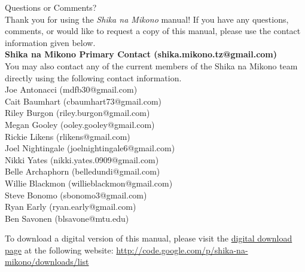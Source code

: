 \begin{center}
{\Huge Questions or Comments?}\\[12pt]
Thank you for using the \textit{Shika na Mikono} manual! If you have any questions, comments, or would like to request a copy of this manual, please use the contact information given below.\\[20pt]
\textbf{Shika na Mikono Primary Contact (shika.mikono.tz@gmail.com)}\\[20pt]
You may also contact any of the current members of the Shika na Mikono team directly using the following contact information.\\[20pt]
Joe Antonacci (mdfb30@gmail.com)\\
Cait Baumhart (cbaumhart73@gmail.com)\\
Riley Burgon (riley.burgon@gmail.com)\\
Megan Gooley (ooley.gooley@gmail.com)\\
Rickie Likens (rlikens@gmail.com)\\
Joel Nightingale (joelnightingale6@gmail.com)\\
Nikki Yates (nikki.yates.0909@gmail.com)\\
\vspace{6pt}
Belle Archaphorn (belledundi@gmail.com)\\
Willie Blackmon (willieblackmon@gmail.com)\\
Steve Bonomo (sbonomo3@gmail.com)\\
Ryan Early (ryan.early@gmail.com)\\
Ben Savonen (blsavone@mtu.edu)\\

\end{center}
\vfill
To download a digital version of this manual, please visit the \href{http://code.google.com/p/shika-na-mikono/downloads/list}{digital download page} at the following website: \url{http://code.google.com/p/shika-na-mikono/downloads/list}